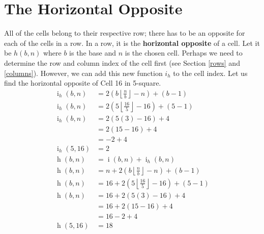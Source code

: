 \documentclass[twoside,openany,12pt]{book}
\begin{document}
    \section{The Horizontal Opposite} \label{horizontal_opposite}
    All of the cells belong to their respective row; there has to be an opposite for each of the cells in a row. In a row, it is the \textbf{horizontal opposite} of a cell. Let it be $h(b,n)$ where $b$ is the base and $n$ is the chosen cell. Perhaps we need to determine the row and column index of the cell first (see Section \ref{rows} and \ref{columns}). However, we can add this new function $i_h$ to the cell index. Let us find the horizontal opposite of Cell 16 in 5-square.
    \begin{equation}
      \begin{split}
        \operatorname{i}_h(b,n) &= 2(b\left\lfloor \frac{n}{b} \right\rfloor - n) + (b - 1) \\
        \operatorname{i}_h(b,n) &= 2(5\left\lfloor \frac{16}{5} \right\rfloor - 16) + (5 - 1) \\
        \operatorname{i}_h(b,n) &= 2(5(3) - 16) + 4 \\
                                 &= 2(15 - 16) + 4 \\
                                 &= -2 + 4 \\
        \operatorname{i}_h(5,16) &= 2 \\
        \operatorname{h}(b,n) &= \operatorname{i}(b,n) + \operatorname{i}_h(b,n) \\
        \operatorname{h}(b,n) &= n + 2(b\left\lfloor \frac{n}{b} \right\rfloor - n) + (b - 1) \\
        \operatorname{h}(b,n) &= 16 + 2(5\left\lfloor \frac{16}{5} \right\rfloor - 16) + (5 - 1) \\
        \operatorname{h}(b,n) &= 16 + 2(5(3) - 16) + 4 \\
                              &= 16 + 2(15 - 16) + 4 \\
                              &= 16 - 2 + 4 \\
        \operatorname{h}(5,16) &= 18
      \end{split}
    \end{equation}
\end{document}
